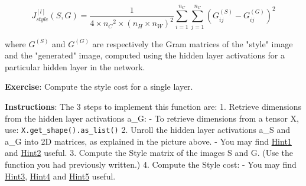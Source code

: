 \documentclass[11pt]{article}
\begin{document}
\[J_{style}^{[l]}(S,G) = \frac{1}{4 \times {n_C}^2 \times (n_H \times n_W)^2} \sum _{i=1}^{n_C}\sum_{j=1}^{n_C}(G^{(S)}_{ij} - G^{(G)}_{ij})^2\tag{2} \]

where \(G^{(S)}\) and \(G^{(G)}\) are respectively the Gram matrices of
the "style" image and the "generated" image, computed using the hidden
layer activations for a particular hidden layer in the network.

    \textbf{Exercise}: Compute the style cost for a single layer.

\textbf{Instructions}: The 3 steps to implement this function are: 1.
Retrieve dimensions from the hidden layer activations a\_G: - To
retrieve dimensions from a tensor X, use:
\texttt{X.get\_shape().as\_list()} 2. Unroll the hidden layer
activations a\_S and a\_G into 2D matrices, as explained in the picture
above. - You may find
\href{https://www.tensorflow.org/versions/r1.3/api_docs/python/tf/transpose}{Hint1}
and
\href{https://www.tensorflow.org/versions/r1.2/api_docs/python/tf/reshape}{Hint2}
useful. 3. Compute the Style matrix of the images S and G. (Use the
function you had previously written.) 4. Compute the Style cost: - You
may find
\href{https://www.tensorflow.org/api_docs/python/tf/reduce_sum}{Hint3},
\href{https://www.tensorflow.org/api_docs/python/tf/square}{Hint4} and
\href{https://www.tensorflow.org/api_docs/python/tf/subtract}{Hint5}
useful.
\end{document}
